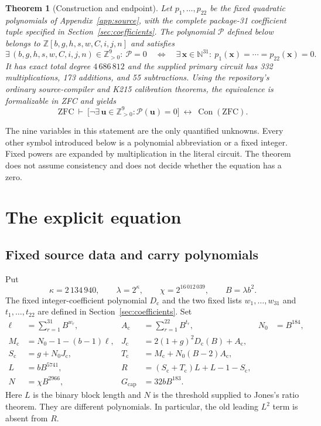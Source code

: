 \documentclass[11pt]{article}
\newcommand{\N}{\mathbb N}
\newcommand{\Z}{\mathbb Z}
\newcommand{\Pos}{\mathbb Z_{>0}}
\newcommand{\Con}{\operatorname{Con}}
\newcommand{\Gcap}{G_{\mathrm{cap}}}
\newcommand{\Sc}{S_{\mathrm c}}
\newcommand{\Tc}{T_{\mathrm c}}
\newcommand{\Jc}{J_{\mathrm c}}
\newcommand{\Mc}{M_{\mathrm c}}
\newcommand{\Dc}{D_{\mathrm c}}
\newcommand{\Ac}{A_{\mathrm c}}
\newtheorem{theorem}{Theorem}[section]
\theoremstyle{remark}\newtheorem{remark}[theorem]{Remark}
\begin{document}
\begin{theorem}[Construction and endpoint]\label{thm:main}
Let $p_1,\ldots,p_{22}$ be the fixed quadratic polynomials of
Appendix~\ref{app:source}, with the complete package-31 coefficient tuple
specified in Section~\ref{sec:coefficients}. The polynomial $\mathcal P$
defined below belongs to $\Z[b,g,h,s,w,C,i,j,n]$ and satisfies
\[
 \exists\,(b,g,h,s,w,C,i,j,n)\in\Pos^9:\ \mathcal P=0
 \quad\Longleftrightarrow\quad
 \exists\,\mathbf x\in\N^{31}:\ p_1(\mathbf x)=\cdots=p_{22}(\mathbf x)=0.
\]
It has exact total degree $4\,686\,812$ and the supplied primary circuit
has 332 multiplications, 173 additions, and 55 subtractions.
Using the repository's ordinary source-compiler and K215 calibration
theorems, the equivalence is formalizable in ZFC and yields
\[
 \boxed{\quad
 \mathrm{ZFC}\ \vdash\
 \bigl[\neg\exists\,\mathbf u\in\Pos^9:\mathcal P(\mathbf u)=0\bigr]
 \ \longleftrightarrow\ \Con(\mathrm{ZFC}).\quad}
\]
\end{theorem}

The nine variables in this statement are the only quantified unknowns.
Every other symbol introduced below is a polynomial abbreviation or a
fixed integer. Fixed powers are expanded by multiplication in the literal
circuit. The theorem does not assume consistency and does not decide
whether the equation has a zero.

\section{The explicit equation}\label{sec:equation}

\subsection{Fixed source data and carry polynomials}

Put
\[
 \kappa=2\,134\,940,\qquad
 \lambda=2^\kappa,\qquad
 \chi=2^{16\,012\,039},\qquad B=\lambda b^2.
\]
The fixed integer-coefficient polynomial $\Dc$ and the two fixed lists
$w_1,\ldots,w_{31}$ and $t_1,\ldots,t_{22}$ are defined in
Section~\ref{sec:coefficients}. Set
\begin{align}
 \ell&=\sum_{r=1}^{31}B^{w_r},&
 \Ac&=\sum_{r=1}^{22}B^{t_r},&N_0&=B^{184},\label{eq:source1}\\
 \Mc&=N_0-1-(b-1)\ell,&
 \Jc&=2(1+g)^2\Dc(B)+\Ac,\label{eq:source2}\\
 \Sc&=g+N_0\Jc,&
 \Tc&=\Mc+N_0(B-2)\Ac,\label{eq:source3}\\
 L&=bB^{5741},&
 R&=(\Sc+\Tc)L+L-1-\Sc,\label{eq:source4}\\
 N&=\chi B^{2966},&
 \Gcap&=32bB^{183}.\label{eq:source5}
\end{align}
Here $L$ is the binary block length and $N$ is the threshold supplied to
Jones's ratio theorem. They are different polynomials. In particular,
the old leading $L^2$ term is absent from $R$.
\end{document}
